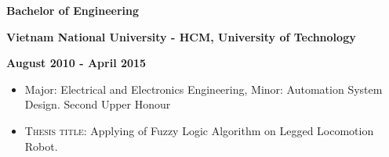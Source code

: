 \documentclass[10pt]{article}
\begin{document}
        \begin{multicols}{3}
            \begin{flushleft}
                \textbf{Bachelor of Engineering}
            \end{flushleft}

            \columnbreak

            \begin{center}
                \textbf{Vietnam National University - HCM, University of Technology}
            \end{center}

            \columnbreak

            \begin{flushright}
                \textbf{August 2010 - April 2015}
            \end{flushright}
        \end{multicols}

        \vspace{-5mm}
        \begin{itemize}[noitemsep]
            \item Major: Electrical and Electronics Engineering, Minor: Automation System Design. Second Upper Honour
            \item \textsc{Thesis title}: Applying of Fuzzy Logic Algorithm on Legged Locomotion Robot.
        \end{itemize}
    \vspace{2mm}
\end{document}

